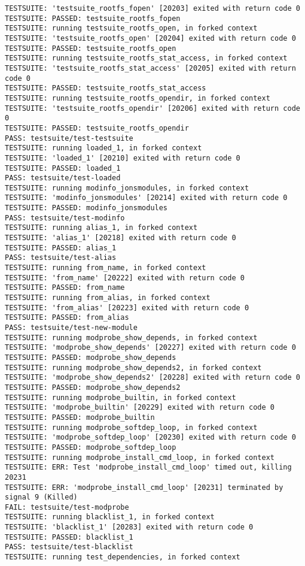 \documentclass[11pt,a4paper]{article}
\begin{document}
{\begin{shaded}
\begin{verbatim}
TESTSUITE: 'testsuite_rootfs_fopen' [20203] exited with return code 0
TESTSUITE: PASSED: testsuite_rootfs_fopen
TESTSUITE: running testsuite_rootfs_open, in forked context
TESTSUITE: 'testsuite_rootfs_open' [20204] exited with return code 0
TESTSUITE: PASSED: testsuite_rootfs_open
TESTSUITE: running testsuite_rootfs_stat_access, in forked context
TESTSUITE: 'testsuite_rootfs_stat_access' [20205] exited with return code 0
TESTSUITE: PASSED: testsuite_rootfs_stat_access
TESTSUITE: running testsuite_rootfs_opendir, in forked context
TESTSUITE: 'testsuite_rootfs_opendir' [20206] exited with return code 0
TESTSUITE: PASSED: testsuite_rootfs_opendir
PASS: testsuite/test-testsuite
TESTSUITE: running loaded_1, in forked context
TESTSUITE: 'loaded_1' [20210] exited with return code 0
TESTSUITE: PASSED: loaded_1
PASS: testsuite/test-loaded
TESTSUITE: running modinfo_jonsmodules, in forked context
TESTSUITE: 'modinfo_jonsmodules' [20214] exited with return code 0
TESTSUITE: PASSED: modinfo_jonsmodules
PASS: testsuite/test-modinfo
TESTSUITE: running alias_1, in forked context
TESTSUITE: 'alias_1' [20218] exited with return code 0
TESTSUITE: PASSED: alias_1
PASS: testsuite/test-alias
TESTSUITE: running from_name, in forked context
TESTSUITE: 'from_name' [20222] exited with return code 0
TESTSUITE: PASSED: from_name
TESTSUITE: running from_alias, in forked context
TESTSUITE: 'from_alias' [20223] exited with return code 0
TESTSUITE: PASSED: from_alias
PASS: testsuite/test-new-module
TESTSUITE: running modprobe_show_depends, in forked context
TESTSUITE: 'modprobe_show_depends' [20227] exited with return code 0
TESTSUITE: PASSED: modprobe_show_depends
TESTSUITE: running modprobe_show_depends2, in forked context
TESTSUITE: 'modprobe_show_depends2' [20228] exited with return code 0
TESTSUITE: PASSED: modprobe_show_depends2
TESTSUITE: running modprobe_builtin, in forked context
TESTSUITE: 'modprobe_builtin' [20229] exited with return code 0
TESTSUITE: PASSED: modprobe_builtin
TESTSUITE: running modprobe_softdep_loop, in forked context
TESTSUITE: 'modprobe_softdep_loop' [20230] exited with return code 0
TESTSUITE: PASSED: modprobe_softdep_loop
TESTSUITE: running modprobe_install_cmd_loop, in forked context
TESTSUITE: ERR: Test 'modprobe_install_cmd_loop' timed out, killing 20231
TESTSUITE: ERR: 'modprobe_install_cmd_loop' [20231] terminated by signal 9 (Killed)
FAIL: testsuite/test-modprobe
TESTSUITE: running blacklist_1, in forked context
TESTSUITE: 'blacklist_1' [20283] exited with return code 0
TESTSUITE: PASSED: blacklist_1
PASS: testsuite/test-blacklist
TESTSUITE: running test_dependencies, in forked context

\end{verbatim}
\end{shaded}}
\end{document}

